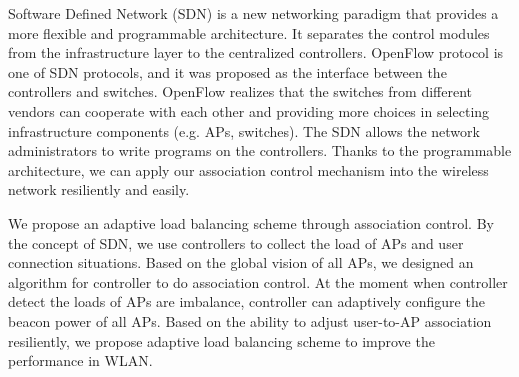 Software Defined Network (SDN) is a new networking paradigm that provides a more flexible and programmable architecture. It separates the control modules from the infrastructure layer to the centralized controllers. OpenFlow protocol \cite{mckeown2008openflow} is one of SDN protocols, and it was proposed as the interface between the controllers and switches. OpenFlow realizes that the switches from different vendors can cooperate with each other and providing more choices in selecting infrastructure components (e.g. APs, switches). The SDN allows the network administrators to write programs on the controllers. Thanks to the programmable architecture, we can apply our association control mechanism into the wireless network resiliently and easily.

We propose an adaptive load balancing scheme through association control. By the concept of SDN, we use controllers to collect the load of APs and user connection situations. Based on the global vision of all APs, we designed an algorithm for controller to do association control. At the moment when controller detect the loads of APs are imbalance, controller can adaptively configure the beacon power of all APs. Based on the ability to adjust user-to-AP association resiliently, we propose adaptive load balancing scheme to improve the performance in WLAN.


